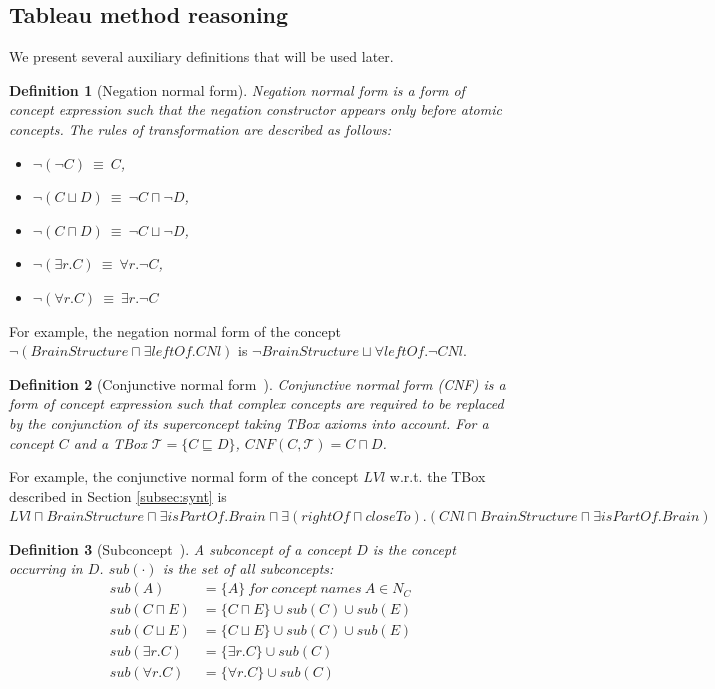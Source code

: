 \documentclass{article}
\newtheorem{mydef}{Definition}
\begin{document}
\subsection{Tableau method reasoning}\label{sec:reasoning}
We present several auxiliary definitions that will be used later.
\begin{mydef}[Negation normal form]
Negation normal form is a form of concept expression such that the negation constructor appears only before atomic concepts.
The rules of transformation are described as follows:
\begin{itemize}
\item  $\neg(\neg C) ~\equiv~ C$,
\item $\neg(C\sqcup D) ~\equiv~ \neg C \sqcap \neg D$,
\item $\neg(C\sqcap D) ~\equiv~ \neg C \sqcup \neg D$,
\item $\neg(\exists r.C) ~\equiv~ \forall r.\neg C$,
\item $\neg(\forall r.C) ~\equiv~  \exists r.\neg C$
\end{itemize}
\end{mydef}
For example, the negation normal form of the concept $\neg (BrainStructure\sqcap \exists leftOf.CNl)$ is $\neg BrainStructure \sqcup \forall leftOf.\neg CNl$.

\begin{mydef}[Conjunctive normal form~\cite{di2007semantic}]
Conjunctive normal form (CNF) is a form of concept expression such that complex concepts are required to be replaced by the conjunction
of its superconcept taking TBox axioms into account.
For a concept $C$ and a TBox $\mathcal{T}=\{C\sqsubseteq D\}$, $CNF(C,\mathcal{T})=C\sqcap D$.
\end{mydef}
For example, the conjunctive normal form of the concept $LVl$ w.r.t. the TBox described in Section \ref{subsec:synt} is
$LVl \sqcap BrainStructure \sqcap \exists isPartOf. Brain \sqcap \exists (rightOf \sqcap closeTo). (CNl \sqcap BrainStructure \sqcap \exists isPartOf. Brain)$

\begin{mydef}[Subconcept~\cite{horrocks1999description}]
 A subconcept of a concept $D$ is the concept occurring in $D$. $sub(\cdot)$ is the set of all subconcepts:
 \begin{align*}
 sub(A)&=\{A\}~for~concept~names~A\in N_C\\
 sub(C\sqcap E)&=\{C\sqcap E\}\cup sub(C)\cup sub(E)\\
 sub(C\sqcup E)&=\{C\sqcup E\}\cup sub(C)\cup sub(E)\\
 sub(\exists r.C)&=\{\exists r.C\}\cup sub(C)\\
 sub(\forall r.C)&=\{\forall r.C\}\cup sub(C)
 \end{align*}
\end{mydef}
\end{document}
